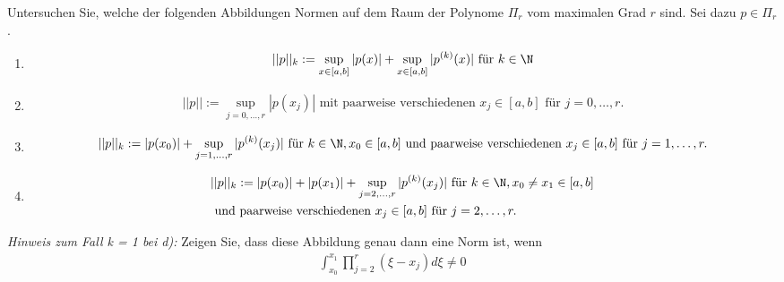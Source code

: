 \begin{exercise}
Untersuchen Sie, welche der folgenden Abbildungen Normen auf dem Raum der Polynome
$\Pi_r$ vom maximalen Grad $r$ sind. Sei dazu $p \in \Pi_r$.
\begin{enumerate}[label = \textbf{\alph*)}]
  \item \begin{align*}
    ||p||_k := \sup_{x \in [a,b]} |p(x)| + \sup_{x \in [a,b]}|p^{(k)}(x)|
    \text{ für } k \in \N
      \end{align*}
  \item \begin{align*}
    ||p|| := \sup_{j = 0,\dots,r} |p(x_j)| \text { mit paarweise verschiedenen }
    x_j \in [a,b] \text{ für } j = 0,\dots,r.
    \end{align*}
  \item \begin{align*}
    ||p||_k := |p(x_0)| + \sup_{j = 1,\dots,r}|p^{(k)}(x_j)| \text{ für } k \in \N,
    x_0 \in [a,b] \text{ und paarweise verschiedenen } x_j \in [a,b] \text{ für }
    j = 1,\dots,r.
    \end{align*}
  \item \begin{align*}
    &||p||_k := |p(x_0)| + |p(x_1)| + \sup_{j = 2,\dots,r} |p^{(k)}(x_j)| \text{ für }
    k \in \N, x_0 \neq x_1 \in [a,b] \\
     &\text{ und paarweise verschiedenen } x_j \in [a,b] \text{ für } j = 2,\dots,r.
  \end{align*}
\end{enumerate}
\textit{Hinweis zum Fall k = 1 bei d):} Zeigen Sie, dass diese Abbildung genau
dann eine Norm ist, wenn
\begin{align*}
  \int_{x_0}^{x_1} \prod_{j=2}^r \left(\xi - x_j\right)d\xi \neq 0
\end{align*}
\end{exercise}
